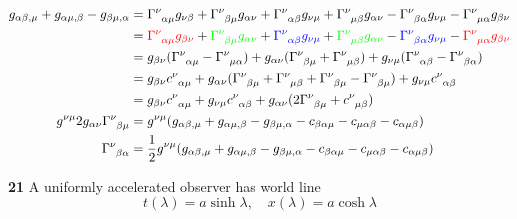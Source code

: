 \documentclass[gr-notes.tex]{subfiles}
\begin{document}
\begin{align*}
  g_{\alpha\beta,\mu} + g_{\alpha\mu,\beta} - g_{\beta\mu,\alpha} &=
  \tensor{\Gamma}{^\nu_{\alpha\mu}} g_{\nu\beta} +
  \tensor{\Gamma}{^\nu_{\beta\mu}} g_{\alpha\nu} +
  \tensor{\Gamma}{^\nu_{\alpha\beta}} g_{\nu\mu} +
  \tensor{\Gamma}{^\nu_{\mu\beta}} g_{\alpha\nu} -
  \tensor{\Gamma}{^\nu_{\beta\alpha}} g_{\nu\mu} -
  \tensor{\Gamma}{^\nu_{\mu\alpha}} g_{\beta\nu}
  \\ &=
  {\color{red} \tensor{\Gamma}{^\nu_{\alpha\mu}} g_{\beta\nu}} +
  {\color{green} \tensor{\Gamma}{^\nu_{\beta\mu}} g_{\alpha\nu}} +
  {\color{blue} \tensor{\Gamma}{^\nu_{\alpha\beta}} g_{\nu\mu}} +
  {\color{green} \tensor{\Gamma}{^\nu_{\mu\beta}} g_{\alpha\nu}} -
  {\color{blue} \tensor{\Gamma}{^\nu_{\beta\alpha}} g_{\nu\mu}} -
  {\color{red} \tensor{\Gamma}{^\nu_{\mu\alpha}} g_{\beta\nu}}
  \\ &=
  g_{\beta\nu}
  (\tensor{\Gamma}{^\nu_{\alpha\mu}} - \tensor{\Gamma}{^\nu_{\mu\alpha}}) +
  g_{\alpha\nu}
  (\tensor{\Gamma}{^\nu_{\beta\mu}} + \tensor{\Gamma}{^\nu_{\mu\beta}}) +
  g_{\nu\mu}
  (\tensor{\Gamma}{^\nu_{\alpha\beta}} - \tensor{\Gamma}{^\nu_{\beta\alpha}})
  \\ &=
  g_{\beta\nu} \tensor{c}{^\nu_{\alpha\mu}} +
  g_{\alpha\nu}
  (\tensor{\Gamma}{^\nu_{\beta\mu}} +
   \tensor{\Gamma}{^\nu_{\mu\beta}} +
   \tensor{\Gamma}{^\nu_{\beta\mu}} -
   \tensor{\Gamma}{^\nu_{\beta\mu}}) +
  g_{\nu\mu} \tensor{c}{^\nu_{\alpha\beta}}
  \\ &=
  g_{\beta\nu} \tensor{c}{^\nu_{\alpha\mu}} +
  g_{\nu\mu} \tensor{c}{^\nu_{\alpha\beta}} +
  g_{\alpha\nu}
  (2 \tensor{\Gamma}{^\nu_{\beta\mu}} + \tensor{c}{^\nu_{\mu\beta}})
  \\
  g^{\nu\mu} 2 g_{\alpha\nu} \tensor{\Gamma}{^\nu_{\beta\mu}} &=
  g^{\nu\mu} (
    g_{\alpha\beta,\mu} +
    g_{\alpha\mu,\beta} -
    g_{\beta\mu,\alpha} -
    c_{\beta\alpha\mu}  -
    c_{\mu\alpha\beta}  -
    c_{\alpha\mu\beta}
  )
  \\
  \tensor{\Gamma}{^\nu_{\beta\alpha}} &=
  \frac{1}{2}
  g^{\nu\mu} (
    g_{\alpha\beta,\mu} +
    g_{\alpha\mu,\beta} -
    g_{\beta\mu,\alpha} -
    c_{\beta\alpha\mu}  -
    c_{\mu\alpha\beta}  -
    c_{\alpha\mu\beta}
  )
\end{align*}




\textbf{21}
A uniformly accelerated observer has world line
%
\begin{displaymath}
  t(\lambda) = a \sinh\lambda,
  \quad
  x(\lambda) = a \cosh\lambda
\end{displaymath}
\end{document}
